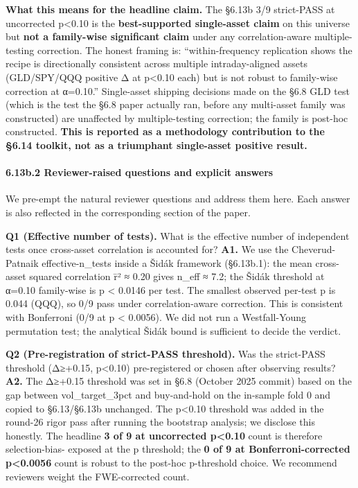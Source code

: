 \documentclass[
]{article}
\begin{document}
\textbf{What this means for the headline claim.} The §6.13b 3/9
strict-PASS at uncorrected p\textless0.10 is the \textbf{best-supported
single-asset claim} on this universe but \textbf{not a family-wise
significant claim} under any correlation-aware multiple-testing
correction. The honest framing is: ``within-frequency replication shows
the recipe is directionally consistent across multiple intraday-aligned
assets (GLD/SPY/QQQ positive Δ at p\textless0.10 each) but is not robust
to family-wise correction at α=0.10.'' Single-asset shipping decisions
made on the §6.8 GLD test (which is the test the §6.8 paper actually
ran, before any multi-asset family was constructed) are unaffected by
multiple-testing correction; the family is post-hoc constructed.
\textbf{This is reported as a methodology contribution to the §6.14
toolkit, not as a triumphant single-asset positive result.}

\paragraph{6.13b.2 Reviewer-raised questions and explicit
answers}\label{b.2-reviewer-raised-questions-and-explicit-answers}

We pre-empt the natural reviewer questions and address them here. Each
answer is also reflected in the corresponding section of the paper.

\textbf{Q1 (Effective number of tests).} What is the effective number of
independent tests once cross-asset correlation is accounted for?
\textbf{A1.} We use the Cheverud-Patnaik effective-n\_tests inside a
Šidák framework (§6.13b.1): the mean cross-asset squared correlation r̄²
≈ 0.20 gives n\_eff ≈ 7.2; the Šidák threshold at α=0.10 family-wise is
p \textless{} 0.0146 per test. The smallest observed per-test p is 0.044
(QQQ), so 0/9 pass under correlation-aware correction. This is
consistent with Bonferroni (0/9 at p \textless{} 0.0056). We did not run
a Westfall-Young permutation test; the analytical Šidák bound is
sufficient to decide the verdict.

\textbf{Q2 (Pre-registration of strict-PASS threshold).} Was the
strict-PASS threshold (Δ≥+0.15, p\textless0.10) pre-registered or chosen
after observing results? \textbf{A2.} The Δ≥+0.15 threshold was set in
§6.8 (October 2025 commit) based on the gap between vol\_target\_3pct
and buy-and-hold on the in-sample fold 0 and copied to §6.13/§6.13b
unchanged. The p\textless0.10 threshold was added in the round-26 rigor
pass after running the bootstrap analysis; we disclose this honestly.
The headline \textbf{3 of 9 at uncorrected p\textless0.10} count is
therefore selection-bias- exposed at the p threshold; the \textbf{0 of 9
at Bonferroni-corrected p\textless0.0056} count is robust to the
post-hoc p-threshold choice. We recommend reviewers weight the
FWE-corrected count.
\end{document}
